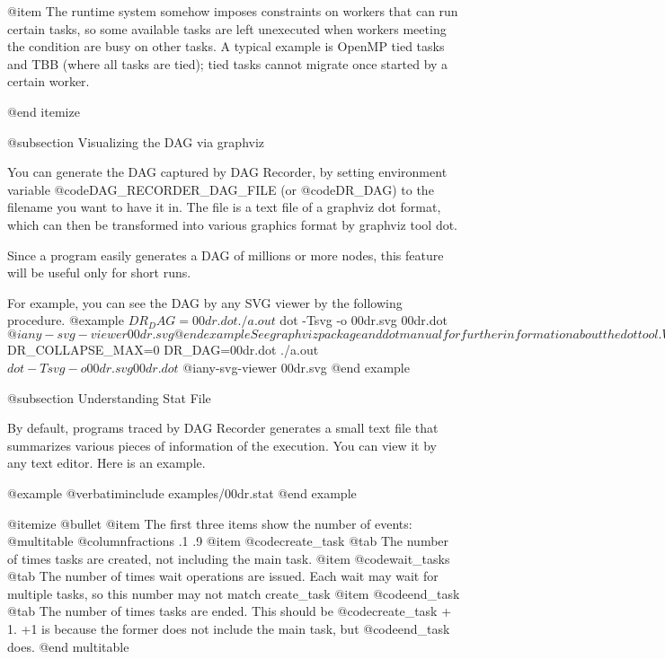 @item The runtime system somehow imposes constraints on workers that can run 
certain tasks, so some available tasks are left unexecuted when workers
meeting the condition are busy on other tasks.  A typical example is
OpenMP tied tasks and TBB (where all tasks are tied); tied tasks cannot
migrate once started by a certain worker.

@end itemize

@subsection Visualizing the DAG via graphviz

You can generate the DAG captured by DAG Recorder, by setting
environment variable @code{DAG_RECORDER_DAG_FILE} 
(or @code{DR_DAG}) to the filename
you want to have it in.  The file is a text file of a graphviz dot
format, which can then be transformed into various graphics format by
graphviz tool dot.

Since a program easily generates a DAG of millions or more nodes, this
feature will be useful only for short runs.  

For example, you can see the DAG by any SVG viewer by the following
procedure.
@example
$ DR_DAG=00dr.dot ./a.out
$ dot -Tsvg -o 00dr.svg 00dr.dot 
$ @i{any-svg-viewer} 00dr.svg
@end example

See graphviz package and dot manual for further information about the
dot tool.

When you use this feature to visualize the true topology of the DAG your
program generated, you might want to turn off the subgraph contraction
algorithm DAG Recorder implements to save space.  To this end, you can
set @code{DR_COLLAPSE_MAX} environment variable to zero.

@example
$ DR_COLLAPSE_MAX=0 DR_DAG=00dr.dot ./a.out
$ dot -Tsvg -o 00dr.svg 00dr.dot 
$ @i{any-svg-viewer} 00dr.svg
@end example

@subsection Understanding Stat File

By default, programs traced by DAG Recorder generates a small text file that summarizes various pieces of information of the execution.  You can view it by any text editor.  Here is an example.

@example
@verbatiminclude examples/00dr.stat
@end example

@itemize @bullet
@item The first three items show the number of events:
@multitable @columnfractions .1 .9
@item @code{create_task} @tab The number of times tasks are created, not including the main task.
@item @code{wait_tasks} @tab The number of times wait operations are issued. Each wait may wait for multiple tasks, so this number may not match create_task
@item @code{end_task} @tab The number of times tasks are ended. This should be @code{create_task} + 1.  +1 is because the former does not include the main task, but @code{end_task} does.
@end multitable


